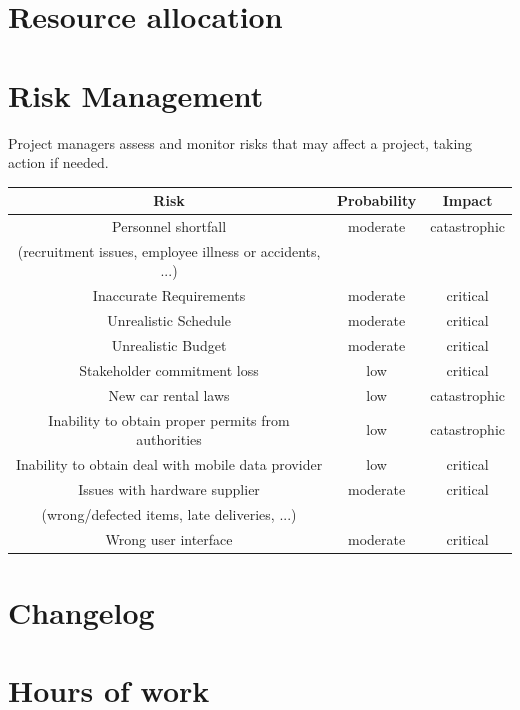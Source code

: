 \documentclass[english]{article}
\begin{document}
\section{Resource allocation}


\section{Risk Management}
Project managers assess and monitor risks that may affect a project, taking action if needed.   
\begin{center}
	\begin{tabular}{|c|c|c|}
		\hline
		\textbf{Risk} & \textbf{Probability } &  \textbf{Impact} \\
		\hline
		Personnel shortfall & moderate & catastrophic\\(recruitment issues, employee illness or accidents, ...) & & \\
		\hline
		Inaccurate Requirements & moderate & critical\\
		\hline
		Unrealistic Schedule & moderate & critical\\
		\hline
		Unrealistic Budget & moderate & critical\\
		\hline
		Stakeholder commitment loss & low & critical\\
		\hline
		New car rental laws & low & catastrophic \\
		\hline
		Inability to obtain proper permits from authorities  & low & catastrophic \\
		\hline
		Inability to obtain deal with mobile data provider  & low & critical \\
		\hline		
		Issues with hardware supplier & moderate & critical \\
		(wrong/defected items, late deliveries, ...) & & \\
		\hline
		Wrong user interface & moderate & critical\\
		\hline
	\end{tabular}
\end{center}


\appendix

\section{Changelog}

\section{Hours of work}
\end{document}
